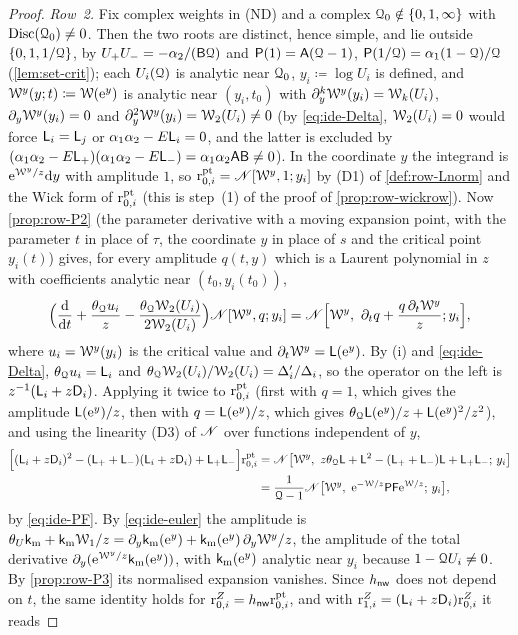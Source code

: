 \begin{proof}
\emph{Row~2.} Fix complex weights in (ND) and a complex $\mathcal{Q}_0\notin\{0,1,\infty\}$ with $\operatorname{Disc}(\mathcal{Q}_0)\neq 0$. Then the two roots are distinct, hence simple, and lie outside $\{0,1,1/\mathcal{Q}\}$, by $U_+U_-=-\alpha_2/(\mathsf{B}\mathcal{Q})$ and $\mathsf{P}(1)=\mathsf{A}(\mathcal{Q}-1)$, $\mathsf{P}(1/\mathcal{Q})=\alpha_1(1-\mathcal{Q})/\mathcal{Q}$ (\cref{lem:set-crit}); each $U_i(\mathcal{Q})$ is analytic near $\mathcal{Q}_0$, $y_i\coloneqq\log U_i$ is defined, and $\mathcal{W}^y(y;t)\coloneqq\mathcal{W}(\mathrm{e}^y)$ is analytic near $(y_i,t_0)$ with $\partial_y^k\mathcal{W}^y(y_i)=\mathcal{W}_k(U_i)$, $\partial_y\mathcal{W}^y(y_i)=0$ and $\partial_y^2\mathcal{W}^y(y_i)=\mathcal{W}_2(U_i)\neq 0$ (by \cref{eq:ide-Delta}, $\mathcal{W}_2(U_i)=0$ would force $\mathsf{L}_i=\mathsf{L}_j$ or $\alpha_1\alpha_2-E\mathsf{L}_i=0$, and the latter is excluded by $(\alpha_1\alpha_2-E\mathsf{L}_+)(\alpha_1\alpha_2-E\mathsf{L}_-)=\alpha_1\alpha_2\mathsf{A}\mathsf{B}\neq 0$). In the coordinate $y$ the integrand is $\mathrm{e}^{\mathcal{W}^y/z}\mathrm{d} y$ with amplitude $1$, so $\mathrm{r}^{\mathrm{pt}}_{0,i}=\mathscr{N}[\mathcal{W}^y,1;y_i]$ by (D1) of \cref{def:row-Lnorm} and the Wick form of $\mathrm{r}^{\mathrm{pt}}_{0,i}$ (this is step~(1) of the proof of \cref{prop:row-wickrow}). Now \cref{prop:row-P2} (the parameter derivative with a moving expansion point, with the parameter $t$ in place of $\tau$, the coordinate $y$ in place of $s$ and the critical point $y_i(t)$) gives, for every amplitude $q(t,y)$ which is a Laurent polynomial in $z$ with coefficients analytic near $(t_0,y_i(t_0))$,
\[
\Big(\frac{\dd}{\dd t}+\frac{\thQ u_i}{z}-\frac{\thQ\cW_2(U_i)}{2\cW_2(U_i)}\Big)\Lnorm[\cW^y,q;y_i]=\Lnorm\Big[\cW^y,\ \de_tq+\frac{q\,\de_t\cW^y}{z};y_i\Big],
\]
where $u_i=\mathcal{W}^y(y_i)$ is the critical value and $\partial_t\mathcal{W}^y=\mathsf{L}(\mathrm{e}^y)$. By (i) and \cref{eq:ide-Delta}, $\theta_{\mathcal{Q}} u_i=\mathsf{L}_i$ and $\theta_{\mathcal{Q}}\mathcal{W}_2(U_i)/\mathcal{W}_2(U_i)=\Delta_i'/\Delta_i$, so the operator on the left is $z^{-1}(\mathsf{L}_i+z\mathsf{D}_i)$. Applying it twice to $\mathrm{r}^{\mathrm{pt}}_{0,i}$ (first with $q=1$, which gives the amplitude $\mathsf{L}(\mathrm{e}^y)/z$, then with $q=\mathsf{L}(\mathrm{e}^y)/z$, which gives $\theta_{\mathcal{Q}}\mathsf{L}(\mathrm{e}^y)/z+\mathsf{L}(\mathrm{e}^y)^2/z^2$), and using the linearity (D3) of $\mathscr{N}$ over functions independent of $y$,
\begin{align*}
\Big[(\Lv_i+z\Dop_i)^2-(\Lv_++\Lv_-)(\Lv_i+z\Dop_i)+\Lv_+\Lv_-\Big]\rpt_{0,i}
&=\Lnorm\big[\cW^y,\ z\thQ\Lv+\Lv^2-(\Lv_++\Lv_-)\Lv+\Lv_+\Lv_-;\,y_i\big]\\
&=\frac{1}{\cQ-1}\Lnorm\big[\cW^y,\ \re^{-\cW/z}\idePF\re^{\cW/z};\,y_i\big],
\end{align*}
by \cref{eq:ide-PF}. By \cref{eq:ide-euler} the amplitude is $\theta_{U}\mathsf{k}_{\mathrm{m}}+\mathsf{k}_{\mathrm{m}}\mathcal{W}_1/z=\partial_y\mathsf{k}_{\mathrm{m}}(\mathrm{e}^y)+\mathsf{k}_{\mathrm{m}}(\mathrm{e}^y)\,\partial_y\mathcal{W}^y/z$, the amplitude of the total derivative $\partial_y(\mathrm{e}^{\mathcal{W}^y/z}\mathsf{k}_{\mathrm{m}}(\mathrm{e}^y))$, with $\mathsf{k}_{\mathrm{m}}(\mathrm{e}^y)$ analytic near $y_i$ because $1-\mathcal{Q} U_i\neq 0$. By \cref{prop:row-P3} its normalised expansion vanishes. Since $h_{\mathsf{nw}}$ does not depend on $t$, the same identity holds for $\mathrm{r}^{Z}_{0,i}=h_{\mathsf{nw}}\mathrm{r}^{\mathrm{pt}}_{0,i}$, and with $\mathrm{r}^{Z}_{1,i}=(\mathsf{L}_i+z\mathsf{D}_i)\mathrm{r}^{Z}_{0,i}$ it reads

\end{proof}
